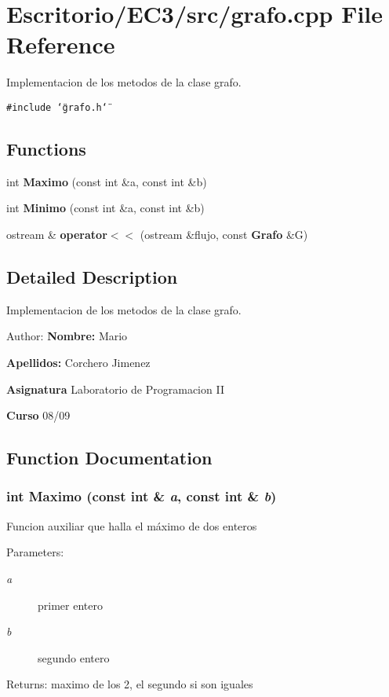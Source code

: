 \section{Escritorio/EC3/src/grafo.cpp File Reference}
\label{grafo_8cpp}
Implementacion de los metodos de la clase grafo. 

{\tt \#include \char`\"{}grafo.h\char`\"{}}\par
\subsection*{Functions}
\begin{CompactItemize}
\item 
int {\bf Maximo} (const int \&a, const int \&b)
\item 
int {\bf Minimo} (const int \&a, const int \&b)
\item 
ostream \& {\bf operator$<$$<$} (ostream \&flujo, const {\bf Grafo} \&G)
\end{CompactItemize}


\subsection{Detailed Description}
Implementacion de los metodos de la clase grafo. 

\begin{Desc}
\item[Author:]{\bf Nombre:} Mario \par
 {\bf Apellidos:} Corchero Jimenez \par
 {\bf Asignatura} Laboratorio de Programacion II \par
 {\bf Curso} 08/09 \end{Desc}


\subsection{Function Documentation}
\subsubsection{\setlength{\rightskip}{0pt plus 5cm}int Maximo (const int \& {\em a}, const int \& {\em b})}\label{grafo_8cpp_bd67fd90183cf2cea5f41d88b098ba97}


Funcion auxiliar que halla el máximo de dos enteros \begin{Desc}
\item[Parameters:]
\begin{description}
\item[{\em a}]primer entero \item[{\em b}]segundo entero \end{description}
\end{Desc}
\begin{Desc}
\item[Returns:]maximo de los 2, el segundo si son iguales \end{Desc}
